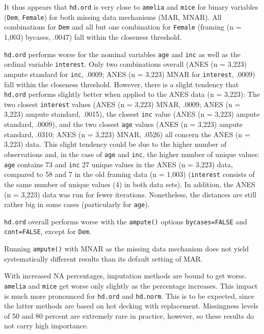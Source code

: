 \documentclass[12pt,econ]{sources/authesis}
\begin{document}
It thus appears that \texttt{hd.ord} is very close to \texttt{amelia} and \texttt{mice} for binary variables (\texttt{Dem}, \texttt{Female}) for both missing data mechanisms (MAR, MNAR). All combinations for \texttt{Dem} and all but one combination for \texttt{Female} (framing (n = 1,003) bycases, .0047) fall within the closeness threshold.

\texttt{hd.ord} performs worse for the nominal variables \texttt{age} and \texttt{inc} as well as the ordinal variable \texttt{interest}. Only two combinations overall (ANES (n = 3,223) ampute standard for \texttt{inc}, .0009; ANES (n = 3,223) MNAR for \texttt{interest}, .0009) fall within the closeness threshold. However, there is a slight tendency that \texttt{hd.ord} performs slightly better when applied to the ANES data (n = 3,223): The two closest \texttt{interest} values (ANES (n = 3,223) MNAR, .0009; ANES (n = 3,223) ampute standard, .0015), the closest \texttt{inc} value (ANES (n = 3,223) ampute standard, .0009), and the two closest \texttt{age} values (ANES (n = 3,223) ampute standard, .0310; ANES (n = 3,223) MNAR, .0526) all concern the ANES (n = 3,223) data. This slight tendency could be due to the higher number of observations and, in the case of \texttt{age} and \texttt{inc}, the higher number of unique values: \texttt{age} contains 73 and \texttt{inc} 27 unique values in the ANES (n = 3,223) data, compared to 58 and 7 in the old framing data (n = 1,003) (\texttt{interest} consists of the same number of unique values (4) in both data sets). In addition, the ANES (n = 3,223) data was run for fewer iterations. Nonetheless, the distances are still rather big in some cases (particularly for \texttt{age}).

\texttt{hd.ord} overall performs worse with the \texttt{ampute()} options \texttt{bycases=FALSE} and \texttt{cont=FALSE}, except for \texttt{Dem}.

Running \texttt{ampute()} with MNAR as the missing data mechanism does not yield systematically different results than its default setting of MAR.

With increased NA percentages, imputation methods are bound to get worse. \texttt{amelia} and \texttt{mice} get worse only slightly as the percentage increases. This impact is much more pronounced for \texttt{hd.ord} and \texttt{hd.norm}. This is to be expected, since the latter methods are based on hot decking with replacement. Missingness levels of 50 and 80 percent are extremely rare in practice, however, so these results do not carry high importance.
\end{document}
